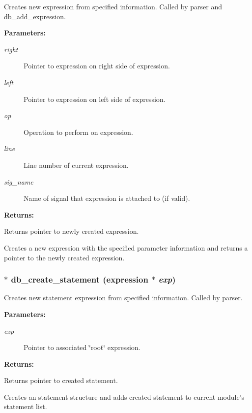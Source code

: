 Creates new expression from specified information. Called by parser and db\_\-add\_\-expression.

\begin{Desc}
\item[{\bf Parameters: }]\par
\begin{description}
\item[
{\em right}]Pointer to expression on right side of expression. \item[
{\em left}]Pointer to expression on left side of expression. \item[
{\em op}]Operation to perform on expression. \item[
{\em line}]Line number of current expression. \item[
{\em sig\_\-name}]Name of signal that expression is attached to (if valid).

\end{description}
\end{Desc}
\begin{Desc}
\item[{\bf Returns: }]\par
Returns pointer to newly created expression.

\end{Desc}
Creates a new expression with the specified parameter information and returns a pointer to the newly created expression. 
\subsubsection{ $\ast$ db\_\-create\_\-statement ({\bf expression} $\ast$ {\em exp})}\label{db_8c_a30}


Creates new statement expression from specified information. Called by parser.

\begin{Desc}
\item[{\bf Parameters: }]\par
\begin{description}
\item[
{\em exp}]Pointer to associated \char`\"{}root\char`\"{} expression.

\end{description}
\end{Desc}
\begin{Desc}
\item[{\bf Returns: }]\par
Returns pointer to created statement.

\end{Desc}
Creates an statement structure and adds created statement to current module's statement list. 
